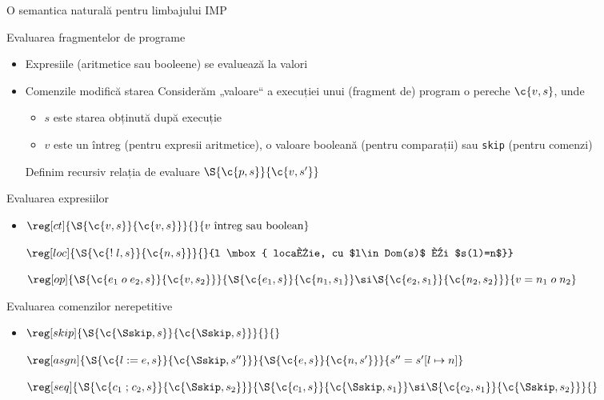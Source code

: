 \begin{section}{O semantica naturală pentru limbajului IMP}
\begin{frame}{Evaluarea fragmentelor de programe}
\begin{itemize}
\item Expresiile (aritmetice sau booleene) se evaluează la valori
\item Comenzile modifică starea
\vitem Considerăm „valoare“ a execuției unui (fragment de) program o pereche $\c{v,s}$, unde
\begin{itemize}
\item $s$ este starea obținută după execuție
\item $v$ este un întreg (pentru expresii aritmetice), o valoare booleană (pentru comparații) sau {\tt skip} (pentru comenzi)
\end{itemize}
\vitem Definim recursiv relația de evaluare $\S{\c{p,s}}{\c{v,s'}}$
\end{itemize}
\end{frame}

\begin{frame}{Evaluarea expresiilor}

\begin{itemize}
\item[] $\reg[ct]{\S{\c{v,s}}{\c{v,s}}}{}{v \mbox{ întreg sau boolean}}$

\vitem[]
$\reg[loc]{\S{\c{{\mathrel{!} l},s}}{\c{n,s}}}{}{l \mbox{ locație, cu $l\in Dom(s)$ și $s(l)=n$}}$

\vitem[]
$\reg[op]{\S{\c{e_1\mathrel{o} e_2,s}}{\c{v,s_2}}}{\S{\c{e_1,s}}{\c{n_1, s_1}}\si \S{\c{e_2,s_1}}{\c{n_2, s_2}}}{v = n_1 \mathrel{o} n_2}$

\end{itemize}

\end{frame}

\begin{frame}{Evaluarea comenzilor nerepetitive}

\begin{itemize}
\item[] $\reg[skip]{\S{\c{\Sskip,s}}{\c{\Sskip,s}}}{}{}$

\vitem[]
$\reg[asgn]{\S{\c{{l\mathrel{:=} e},s}}{\c{\Sskip,s''}}}{\S{\c{e,s}}{\c{n,s'}}}{s'' = s'[ l \mapsto n]}$

\vitem[]
$\reg[seq]{\S{\c{c_1\mathrel{;} c_2,s}}{\c{\Sskip,s_2}}}{\S{\c{c_1,s}}{\c{\Sskip, s_1}}\si \S{\c{c_2,s_1}}{\c{\Sskip, s_2}}}{}$


\end{itemize}
\end{frame}
\end{section}
